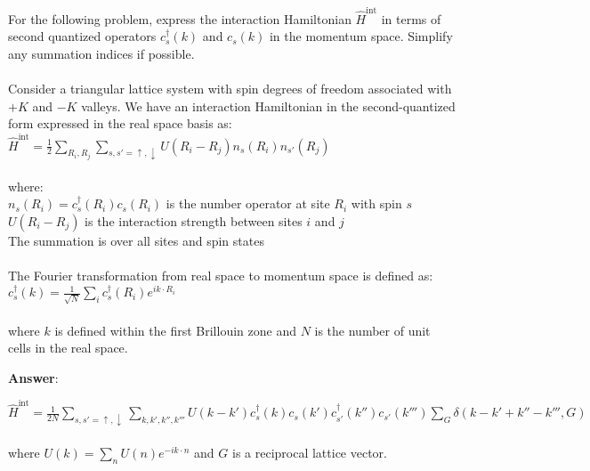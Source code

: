 \documentclass{article}
\begin{document}
   For the following problem, express the interaction Hamiltonian $\hat{H}^{\text{int}}$ in terms of second quantized operators $c_s^\dagger(k)$ and $c_s(k)$ in the momentum space. Simplify any summation indices if possible. \\ \\Consider a triangular lattice system with spin degrees of freedom associated with $+K$ and $-K$ valleys. We have an interaction Hamiltonian in the second-quantized form expressed in the real space basis as: \\$\hat{H}^{\text{int}} = \frac{1}{2} \sum_{R_i,R_j} \sum_{s,s'=\uparrow,\downarrow} U(R_i - R_j)n_s(R_i)n_{s'}(R_j)$ \\ \\where: \\$n_s(R_i) = c_s^\dagger(R_i)c_s(R_i)$ is the number operator at site $R_i$ with spin $s$ \\$U(R_i - R_j)$ is the interaction strength between sites $i$ and $j$ \\The summation is over all sites and spin states \\ \\The Fourier transformation from real space to momentum space is defined as: \\$c_s^\dagger(k) = \frac{1}{\sqrt{N}} \sum_i c_s^\dagger(R_i)e^{ik \cdot R_i}$ \\ \\where $k$ is defined within the first Brillouin zone and $N$ is the number of unit cells in the real space.

   \textbf{Answer}:

   $\hat{H}^{\text{int}} = \frac{1}{2N} \sum_{s,s'=\uparrow,\downarrow} \sum_{k,k',k'',k'''} U(k - k')c_s^\dagger(k)c_s(k')c_{s'}^\dagger(k'')c_{s'}(k''') \sum_G \delta(k-k'+k''-k''',G)$ \\
 \\
where $U(k) = \sum_n U(n)e^{-ik \cdot n}$ and $G$ is a reciprocal lattice vector. \\
\end{document}

